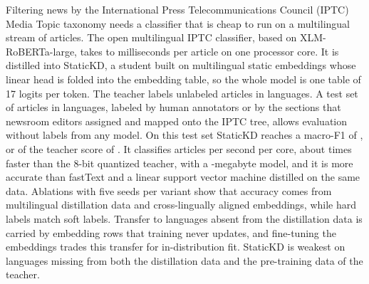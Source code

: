 Filtering news by the International Press Telecommunications Council (IPTC) Media Topic taxonomy needs a classifier that is cheap to run on a multilingual stream of articles. The open multilingual IPTC classifier, based on XLM-RoBERTa-large, takes  to  milliseconds per article on one processor core. It is distilled into StaticKD, a student built on multilingual static embeddings whose linear head is folded into the embedding table, so the whole model is one table of 17 logits per token. The teacher labels  unlabeled articles in  languages. A test set of  articles in  languages, labeled by human annotators or by the sections that newsroom editors assigned and mapped onto the IPTC tree, allows evaluation without labels from any model. On this test set StaticKD reaches a macro-F1 of , or  of the teacher score of . It classifies  articles per second per core, about  times faster than the 8-bit quantized teacher, with a -megabyte model, and it is more accurate than fastText and a linear support vector machine distilled on the same data. Ablations with five seeds per variant show that accuracy comes from multilingual distillation data and cross-lingually aligned embeddings, while hard labels match soft labels. Transfer to languages absent from the distillation data is carried by embedding rows that training never updates, and fine-tuning the embeddings trades this transfer for in-distribution fit. StaticKD is weakest on languages missing from both the distillation data and the pre-training data of the teacher.
